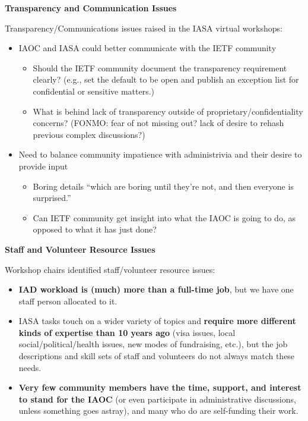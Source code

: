 \documentclass[helvetica]{seminar}
\newcommand{\heading}[1]{%
  \begin{center} 
    \large\bf 
    #1 
  \end{center} 
  \vspace{.4 in}}
\begin{document}
\begin{slide}
\heading{Transparency and Communication Issues}

Transparency/Communications issues raised in the IASA virtual
workshops:
{\footnotesize
\begin{itemize}
\item IAOC and IASA could better communicate with the IETF community
  \begin{itemize}
  \item Should the IETF community document the transparency
    requirement clearly? (e.g., set the default to be open and publish
    an exception list for confidential or sensitive matters.)
  \item What is behind lack of transparency outside of
    proprietary/confidentiality concerns? (FONMO: fear of not missing
    out? lack of desire to rehash previous complex discussions?)
  \end{itemize}
\item Need to balance community impatience with administrivia and
  their desire to provide input
  \begin{itemize}
  \item Boring details ``which are boring until they're not, and then
    everyone is surprised.''
  \item Can IETF community get insight into what the IAOC is going to
    do, as opposed to what it has just done?
  \end{itemize}
\end{itemize}
}
  
\end{slide}


\begin{slide}
\heading{Staff and Volunteer Resource Issues}

Workshop chairs identified staff/volunteer resource issues:
{\footnotesize
\begin{itemize}
\item \textbf{IAD workload is (much) more than a full-time job}, but
  we have one staff person allocated to it.
\item IASA tasks touch on a wider variety of topics and
  \textbf{require more different kinds of expertise than 10 years ago}
  (visa issues, local social/political/health issues, new modes of
  fundraising, etc.), but the job descriptions and skill sets of staff
  and volunteers do not always match these needs.
\item \textbf{Very few community members have the time, support, and
  interest to stand for the IAOC} (or even participate in
  administrative discussions, unless something goes astray), and many
  who do are self-funding their work.
\end{itemize}
}

\end{slide}
\end{document}
